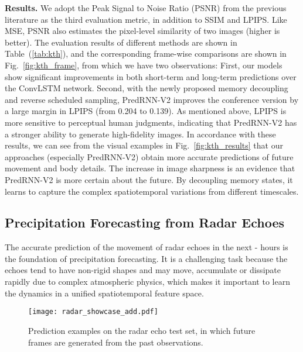 \documentclass[10pt,journal,compsoc]{IEEEtran}
\let\MYoriglatexcaption\caption
\renewcommand{\caption}[2][\relax]{\MYoriglatexcaption[#2]{#2}}
\newcommand{\tab}[1]{Table~(\ref{#1})}
\newcommand{\fig}[1]{Fig.~\ref{#1}}
\newcommand{\myparagraph}[1]{\vspace{5pt} \noindent \textbf{#1.}}
\begin{document}
\myparagraph{Results} 
We adopt the Peak Signal to Noise Ratio (PSNR) from the previous literature as the third evaluation metric, in addition to SSIM and LPIPS. Like MSE, PSNR also estimates the pixel-level similarity of two images (higher is better). 
The evaluation results of different methods are shown in \tab{tab:kth}, and the corresponding frame-wise comparisons are shown in \fig{fig:kth_frame}, from which we have two observations: First, our models show significant improvements in both short-term and long-term predictions over the ConvLSTM network. 
Second, with the newly proposed memory decoupling and reverse scheduled sampling, PredRNN-V2 improves the conference version by a large margin in LPIPS (from 0.204 to 0.139). 
As mentioned above, LPIPS is more sensitive to perceptual human judgments, indicating that PredRNN-V2 has a stronger ability to generate high-fidelity images.
In accordance with these results, we can see from the visual examples in
\fig{fig:kth_results} that our approaches (especially PredRNN-V2) obtain more accurate predictions of future movement and body details.
The increase in image sharpness is an evidence that PredRNN-V2 is more certain about the future. By decoupling memory states, it learns to capture the complex spatiotemporal variations from different timescales.


\subsection{Precipitation Forecasting from Radar Echoes}

The accurate prediction of the movement of radar echoes in the next - hours is the foundation of precipitation forecasting.
It is a challenging task because the echoes tend to have non-rigid shapes and may move, accumulate or dissipate rapidly due to complex atmospheric physics, which makes it important to learn the dynamics in a unified spatiotemporal feature space.

\begin{figure*}[t]
  \centering
  \texttt{[image: radar\_showcase\_add.pdf]}
  \caption{Prediction examples on the radar echo test set, in which  future frames are generated from the past  observations.}
  \label{fig:radar}
\end{figure*}
\end{document}
